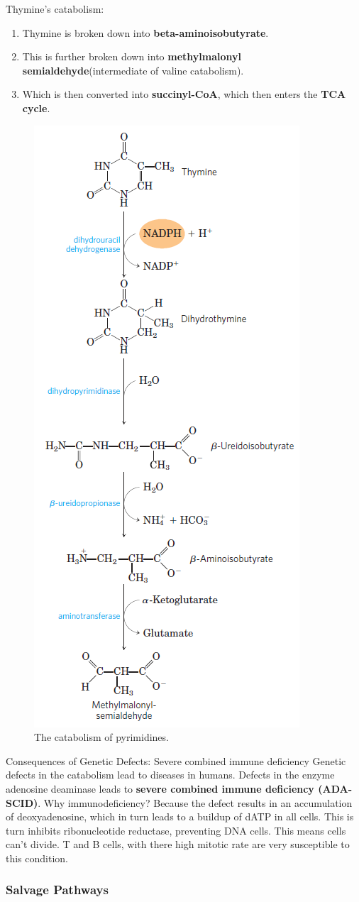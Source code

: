 \documentclass[../main.tex]{subfiles}
\begin{document}
Thymine's catabolism:
\begin{enumerate}
	\item Thymine is broken down into \textbf{\gls{beta-aminoisobutyrate}}.
	\item This is further broken down into \textbf{\gls{methylmalonyl semialdehyde}}(intermediate of valine catabolism).
	\item Which is then converted into \textbf{\gls{succinyl-CoA}}, which then enters the \textbf{TCA cycle}.
\end{enumerate}

\begin{figure}[H]
	\centering
	\includegraphics[width=0.3\linewidth]{pyr_dis}
	\caption{The catabolism of pyrimidines.}
	\label{fig:pyrdis}
\end{figure}


\begin{RemarkWithTitel}{Consequences of Genetic Defects: Severe combined immune deficiency}
	Genetic defects in the catabolism lead to diseases in humans. Defects in the enzyme adenosine deaminase leads to \textbf{\gls{severe combined immune deficiency (ADA-SCID)}}. Why immunodeficiency? Because the defect results in an accumulation of deoxyadenosine, which in turn leads to a buildup of dATP in all cells. This is turn inhibits ribonucleotide reductase, preventing DNA cells. This means cells can't divide. T and B cells, with there high mitotic rate are very susceptible to this condition.
\end{RemarkWithTitel}

\subsubsection{Salvage Pathways}
\end{document}
